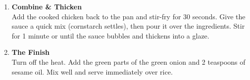 \begin{enumerate}
    \item \textbf{Combine \& Thicken} \\
          Add the cooked chicken back to the pan and stir-fry for 30 seconds.
          Give the sauce a quick mix (cornstarch settles), then pour it over the
          ingredients. Stir for 1 minute or until the sauce bubbles and thickens
          into a glaze.

    \item \textbf{The Finish} \\
          Turn off the heat. Add the green parts of the green onion and 2 teaspoons
          of sesame oil. Mix well and serve immediately over rice.

\end{enumerate}

